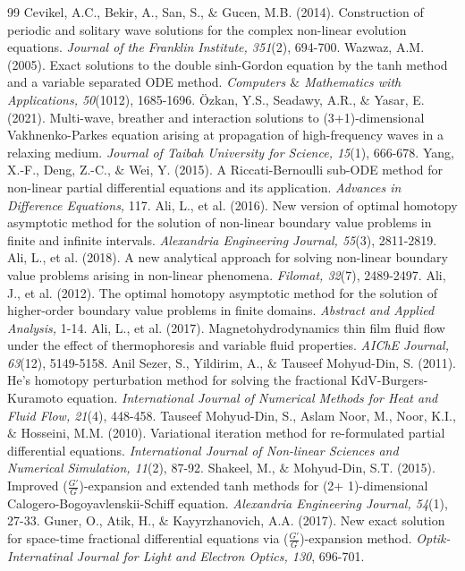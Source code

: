 \documentclass{article}
\numberwithin{equation}{section}
\begin{document}
\begin{thebibliography}{99}
 Cevikel, A.C., Bekir, A., San, S., ${\&}$ Gucen, M.B. (2014). Construction of periodic and solitary wave solutions for the complex non-linear evolution equations. \emph{Journal of the Franklin Institute, 351}(2), 694-700.
 Wazwaz, A.M. (2005). Exact solutions to the double sinh-Gordon equation by the tanh method and a variable separated ODE method. \emph{Computers ${\&}$ Mathematics with Applications, 50}(1012), 1685-1696.
 \"{O}zkan, Y.S., Seadawy, A.R., ${\&}$ Yasar, E. (2021). Multi-wave, breather and interaction solutions to (3+1)-dimensional Vakhnenko-Parkes equation arising at propagation of high-frequency waves in a relaxing medium. \emph{Journal of Taibah University for Science, 15}(1), 666-678.
 Yang, X.-F., Deng, Z.-C., ${\&}$ Wei, Y. (2015). A Riccati-Bernoulli sub-ODE method for non-linear partial differential equations and its application. \emph{Advances in Difference Equations,} 117.
 Ali, L., et al. (2016). New version of optimal homotopy asymptotic method for the solution of non-linear boundary value problems in finite and infinite intervals. \emph{Alexandria Engineering Journal, 55}(3), 2811-2819.
 Ali, L., et al. (2018). A new analytical approach for solving non-linear boundary value problems arising in non-linear phenomena.\emph{ Filomat, 32}(7), 2489-2497.
 Ali, J., et al. (2012). The optimal homotopy asymptotic method for the solution of higher-order boundary value problems in finite domains. \emph{Abstract and Applied Analysis,} 1-14.
 Ali, L., et al. (2017). Magnetohydrodynamics thin film fluid flow under the effect of thermophoresis and variable fluid properties. \emph{AIChE Journal, 63}(12), 5149-5158.
 Anil Sezer, S., Yildirim, A., ${\&}$ Tauseef Mohyud-Din, S. (2011). He's homotopy perturbation method for solving the fractional KdV-Burgers-Kuramoto equation. \emph{International Journal of Numerical Methods for Heat and Fluid Flow, 21}(4), 448-458.
 Tauseef Mohyud-Din, S., Aslam Noor, M., Noor, K.I., ${\&}$ Hosseini, M.M. (2010). Variational iteration method for re-formulated partial differential equations. \emph{ International Journal of Non-linear Sciences and Numerical Simulation, 11}(2), 87-92.
 Shakeel, M., ${\&}$ Mohyud-Din, S.T. (2015). Improved ($\frac{G'}{G}$)-expansion and extended tanh methods for (2+ 1)-dimensional Calogero-Bogoyavlenskii-Schiff equation. \emph{Alexandria Engineering Journal, 54}(1), 27-33.
 Guner, O., Atik, H., ${\&}$ Kayyrzhanovich, A.A. (2017). New exact solution for space-time fractional differential equations via ($\frac{G'}{G}$)-expansion method. \emph{Optik-Internatinal Journal for Light and Electron Optics, 130}, 696-701.

\end{thebibliography}
\end{document}
